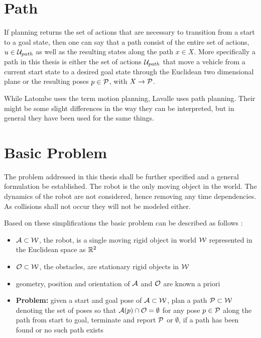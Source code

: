 \section{Path}
If planning returns the set of actions that are necessary to transition from a start to a goal state, then one can say that a path consist of the entire set of actions, $u \in \mathcal{U}_{path}$ as well as the resulting states along the path $x \in X$. More specifically a path in this thesis is either the set of actions $\mathcal{U}_{path}$ that move a vehicle from a current start state to a desired goal state through the Euclidean two dimensional plane or the resulting poses $p \in \mathcal{P}$, with $X \rightarrow \mathcal{P}$.

While Latombe uses the term motion planning, Lavalle uses path planning. Their might be some slight differences in the way they can be interpreted, but in general they have been used for the same things. %

\section{Basic Problem}
The problem addressed in this thesis shall be further specified and a general formulation be established. The robot is the only moving object in the world. The dynamics of the robot are not considered, hence removing any time dependencies. As collisions shall not occur they will not be modeled either.

Based on these simplifications the basic problem can be described as follows \cite{Latombe.1991,LaValle.2006}:
\begin{itemize}
\item $\mathcal{A} \subset \mathcal{W}$, the robot, is a single moving rigid object in world $\mathcal{W}$ represented in the Euclidean space as $\mathbb{R}^2$
\item $\mathcal{O} \subset \mathcal{W}$, the obstacles, are stationary rigid objects in $\mathcal{W}$
\item geometry, position and orientation of $\mathcal{A}$ and $\mathcal{O}$ are known a priori
\item \textbf{Problem:} given a start and goal pose of $\mathcal{A} \subset \mathcal{W}$, plan a path $\mathcal{P} \subset \mathcal{W}$ denoting the set of poses so that $\mathcal{A}(p) \cap \mathcal{O} = \emptyset$ for any pose  $p \in \mathcal{P}$ along the path from start to goal, terminate and report $\mathcal{P}$ or $\emptyset$, if a path has been found or no such path exists
\end{itemize}

